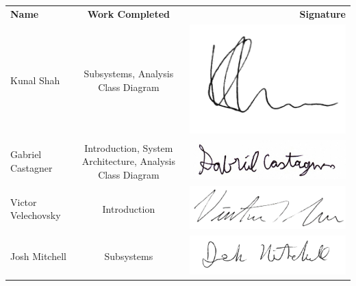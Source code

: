 \documentclass[]{article}
\begin{document}
\begin{tabular}{l c r}
    \textbf{Name} & \textbf{Work Completed} & \textbf{Signature} \\
    
    Kunal Shah & Subsystems, Analysis Class Diagram & 
    \includegraphics[scale=0.2]{../Resources/Signature/Kunal-Sig.png} \\
    
    Gabriel Castagner & Introduction, System Architecture, Analysis Class Diagram &
    \includegraphics[scale=0.2]{../Resources/Signature/Gabe-Sig.png} \\
    
    Victor Velechovsky & Introduction & 
    \includegraphics[scale=0.3]{../Resources/Signature/Vic-Sig.png} \\
    
    Josh Mitchell & Subsystems & 
    \includegraphics[scale=0.2]{../Resources/Signature/Josh-Sig.png} \\
\end{tabular}
\end{document}
